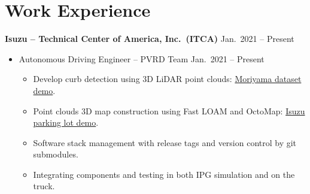 \documentclass[a4paper,10pt,dvipdfmx]{article}
\begin{document}
\section*{Work Experience}
\textbf{Isuzu -- Technical Center of America, Inc.~(ITCA)} \hfill Jan.~2021 -- Present
\begin{itemize}[noitemsep,nolistsep]
	\item[] Autonomous Driving Engineer -- PVRD Team \hfill Jan.~2021 -- Present
    \begin{itemize}[noitemsep,nolistsep]
      \item Develop curb detection using 3D LiDAR point clouds: \href{https://chris7462.github.io/Demo/moriyama.mp4}{Moriyama dataset demo}.
      \item Point clouds 3D map construction using Fast LOAM and OctoMap: \href{https://chris7462.github.io/Demo/3D_map_resolution_0.2.mp4}{Isuzu parking lot demo}.
      \item Software stack management with release tags and version control by git submodules.
      \item Integrating components and testing in both IPG simulation and on the truck.\\
    \end{itemize}
\end{itemize}
\end{document}
